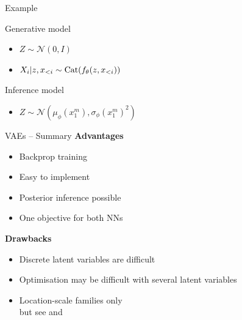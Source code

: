 \begin{frame}{Example}

	Generative model
    	\begin{itemize}
			\item $Z \sim \mathcal N(0, I)$
			\item $X_i | z, x_{<i} \sim \operatorname{Cat}(f_\theta(z, x_{<i}))$\\
    	\end{itemize}
	Inference model
    	\begin{itemize}
			\item $Z \sim \mathcal N(\mu_\phi(x_1^m), \sigma_\phi(x_1^m)^2)$
    	\end{itemize}
	
	
	
\end{frame}



\begin{frame}{VAEs -- Summary}
\textbf{Advantages}
\begin{itemize}
\item Backprop training
\item Easy to implement
\item Posterior inference possible
\item One objective for both NNs
\end{itemize}
\pause
\textbf{Drawbacks}
\begin{itemize}
\item Discrete latent variables are difficult
\item Optimisation may be difficult with several latent variables
\item Location-scale families only\\
but see \citet{RuizEtAl:2016} and \citet{KucukelbirEtAl:2017}
\end{itemize}
\end{frame}


